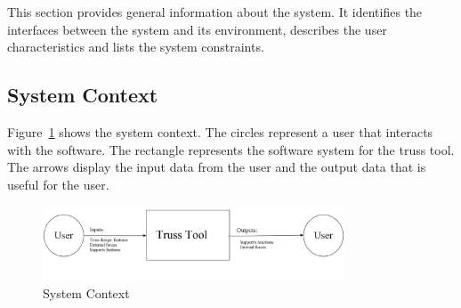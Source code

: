 \documentclass[12pt]{article}
\begin{document}
This section provides general information about the system.  It identifies the interfaces between the system and its environment, describes the user characteristics and lists the system constraints.  %


\subsection{System Context}
Figure~\ref{Fig_SystemContext} shows the system context. The circles 
represent a user that interacts with the software. The rectangle represents the software system for the truss tool. The arrows display the input data from the user and the output data that is useful for the user.

\begin{figure}[h!]
\begin{center}
 \includegraphics[width=0.8\textwidth]{systemcontext.jpg}
\caption{System Context}
\label{Fig_SystemContext} 
\end{center}
\end{figure}
\end{document}
